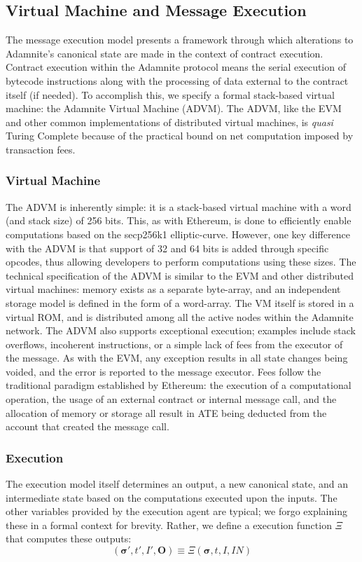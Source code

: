 \documentclass[conference]{IEEEtran}
\begin{document}
\subsection{Virtual Machine and Message Execution}
The message execution model presents a framework through which alterations to Adamnite's canonical state are made in the context of contract execution. Contract execution within the Adamnite protocol means the serial execution of bytecode instructions along with the processing of data external to the contract itself (if needed). To accomplish this, we specify a formal stack-based virtual machine: the Adamnite Virtual Machine (ADVM). The ADVM, like the EVM and other common implementations of distributed virtual machines, is \emph{quasi} Turing Complete because of the practical bound on net computation imposed by transaction fees. 
\subsubsection{Virtual Machine}
The ADVM is inherently simple: it is a stack-based virtual machine with a word (and stack size) of 256 bits. This, as with Ethereum, is done to efficiently enable computations based on the secp256k1 elliptic-curve. However, one key difference with the ADVM is that support of 32 and 64 bits is added through specific opcodes, thus allowing developers to perform computations using these sizes. The technical specification of the ADVM is similar to the EVM and other distributed virtual machines: memory exists as a separate byte-array, and an independent storage model is defined in the form of a word-array. The VM itself is stored in a virtual ROM, and is distributed among all the active nodes within the Adamnite network. The ADVM also supports exceptional execution; examples include stack overflows, incoherent instructions, or a simple lack of fees from the executor of the message. As with the EVM, any exception results in all state changes being voided, and the error is reported to the message executor. Fees follow the traditional paradigm established by Ethereum: the execution of a computational operation, the usage of an external contract or internal message call, and the allocation of memory or storage all result in ATE being deducted from the account that created the message call. 

\subsubsection{Execution}
The execution model itself determines an output, a new canonical state, and an intermediate state based on the computations executed upon the inputs. The other variables provided by the execution agent are typical; we forgo explaining these in a formal context for brevity. Rather, we define a execution function $\Xi$ that computes these outputs:
\begin{equation}
(\boldsymbol{\sigma}', t', I', \mathbf{O}) \equiv \Xi(\boldsymbol{\sigma}, t, I, IN)
\end{equation}
\end{document}
